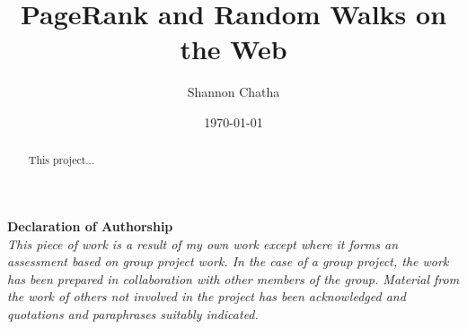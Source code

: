 \documentclass[11pt]{report}
\title{\textbf{PageRank and Random Walks on the Web}}
\author{Shannon Chatha}
\date{\today}
\begin{document}
\maketitle
\begin{abstract}
This project...
\end{abstract}
\newpage
\vspace*{\fill}
\begin{center}
\textbf{Declaration of Authorship}\\ 
\textit{This piece of work is a result of my own work except where it forms an assessment
based on group project work. In the case of a group project, the work
has been prepared in collaboration with other members of the group. Material
from the work of others not involved in the project has been acknowledged and
quotations and paraphrases suitably indicated.}
\end{center}
\vspace*{\fill}

\newpage
\tableofcontents
\listoffigures
\begingroup
\let\clearpage\relax
\listoftables
\endgroup
{}
\end{document}
